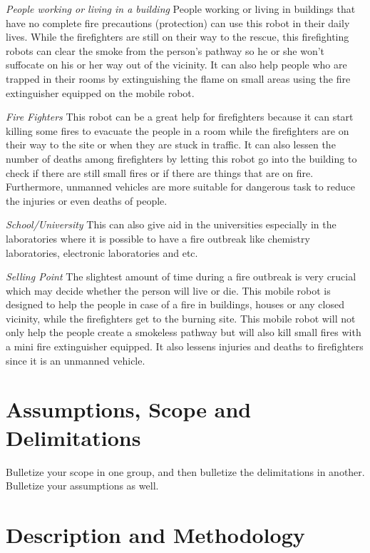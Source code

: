 \textit{People working or living in a building} \newline
People working or living in buildings that have no complete fire precautions (protection) can use this robot in their daily lives. While the firefighters are still on their way to the rescue, this firefighting robots can clear the smoke from the person’s pathway so he or she won’t suffocate on his or her way out of the vicinity. It can also help people who are trapped in their rooms by extinguishing the flame on small areas using the fire extinguisher equipped on the mobile robot. 

\textit{Fire Fighters} \newline
This robot can be a great help for firefighters because it can start killing some fires to evacuate the people in a room while the firefighters are on their way to the site or when they are stuck in traffic. It can also lessen the number of deaths among firefighters by letting this robot go into the building to check if there are still small fires or if there are things that are on fire. Furthermore, unmanned vehicles are more suitable for dangerous task to reduce the injuries or even deaths of people.

\textit{School/University} \newline
This can also give aid in the universities especially in the laboratories where it is possible to have a fire outbreak like chemistry laboratories, electronic laboratories and etc. 

\textit{Selling Point} \newline
The slightest amount of time during a fire outbreak is very crucial which may decide whether the person will live or die. This mobile robot is designed to help the people in case of a fire in buildings, houses or any closed vicinity, while the firefighters get to the burning site. This mobile robot will not only help the people create a smokeless pathway but will also kill small fires with a mini fire extinguisher equipped. It also lessens injuries and deaths to firefighters since it is an unmanned vehicle.

\section{Assumptions, Scope and Delimitations}

Bulletize your scope in one group, and then bulletize the delimitations in another.  Bulletize your assumptions as well.


\section{Description and Methodology}

